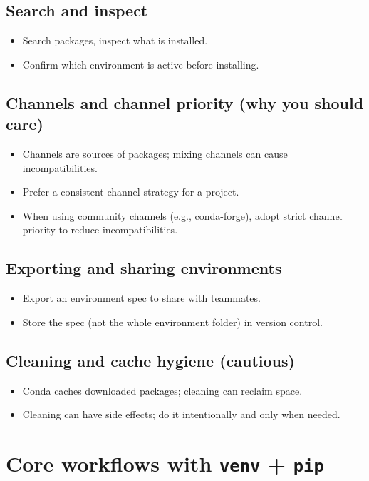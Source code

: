 \subsection{Search and inspect}
\begin{itemize}
\item Search packages, inspect what is installed.
\item Confirm which environment is active before installing.
\end{itemize}

\subsection{Channels and channel priority (why you should care)}
\begin{itemize}
\item Channels are sources of packages; mixing channels can cause incompatibilities.
\item Prefer a consistent channel strategy for a project.
\item When using community channels (e.g., conda-forge), adopt strict channel priority to reduce incompatibilities.
\end{itemize}

\subsection{Exporting and sharing environments}
\begin{itemize}
\item Export an environment spec to share with teammates.
\item Store the spec (not the whole environment folder) in version control.
\end{itemize}

\subsection{Cleaning and cache hygiene (cautious)}
\begin{itemize}
\item Conda caches downloaded packages; cleaning can reclaim space.
\item Cleaning can have side effects; do it intentionally and only when needed.
\end{itemize}

\section{Core workflows with \texttt{venv} + \texttt{pip}}
